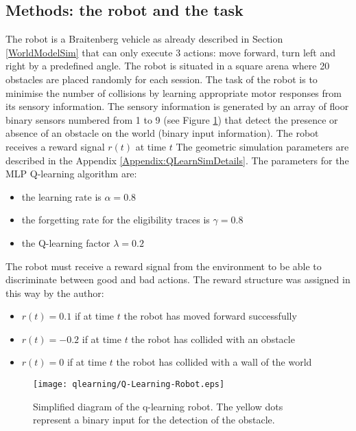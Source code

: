 \subsection{Methods: the robot and the task}
The robot is a Braitenberg vehicle as already described in Section \ref{WorldModelSim}
that can only execute 3 actions: move forward, turn left and right by a predefined angle.
The robot is situated in a square arena where 20 obstacles are placed randomly for each
session.
The task of the robot is to minimise the number of collisions by learning appropriate
motor responses from its sensory information.
The sensory information is generated by an array of floor binary sensors numbered
from 1 to 9 (see Figure \ref{fig:qlearning:robot}) that detect the presence
or absence of an obstacle on the world (binary input information).
The robot receives a reward signal $r(t)$ at time $t$
The geometric simulation parameters are described in the Appendix \ref{Appendix:QLearnSimDetails}.
The parameters for the MLP Q-learning algorithm are:
\begin{itemize}
 \item the learning rate is $\alpha=0.8$
 \item the forgetting rate for the eligibility traces is $\gamma=0.8$
 \item the Q-learning factor $\lambda=0.2$
\end{itemize}
The robot must receive a reward signal from the environment to be able to discriminate
between good and bad actions.
The reward structure was assigned in this way by the author:
\begin{itemize}
 \item $r(t)=0.1$ if at time $t$ the robot has moved forward successfully
 \item $r(t)=-0.2$ if at time $t$ the robot has collided with an obstacle
 \item $r(t)=0$ if at time $t$ the robot has collided with a wall of the world
\end{itemize}

\begin{figure}[tbp]
\begin{center}
\texttt{[image: qlearning/Q-Learning-Robot.eps]}
\end{center}
\small{
\caption[Q learning robot]{Simplified diagram of the q-learning robot.
The yellow dots represent a binary input for the detection of the obstacle.
 \label{fig:qlearning:robot}}}
\end{figure}

